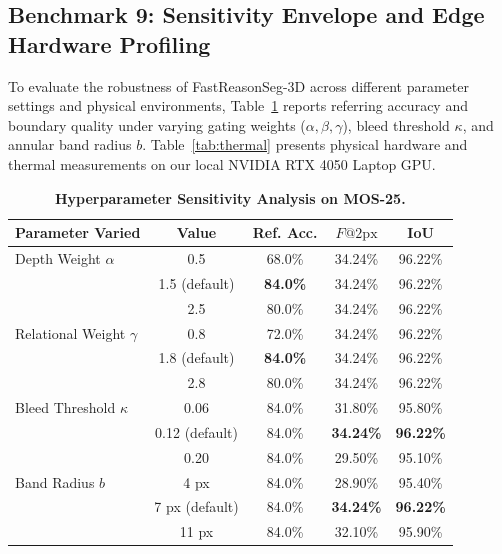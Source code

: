 \documentclass[10pt,twocolumn,letterpaper]{article}
\begin{document}
\subsection{Benchmark 9: Sensitivity Envelope and Edge Hardware Profiling}
To evaluate the robustness of FastReasonSeg-3D across different parameter settings and physical environments, Table~\ref{tab:sensitivity} reports referring accuracy and boundary quality under varying gating weights ($\alpha, \beta, \gamma$), bleed threshold $\kappa$, and annular band radius $b$. Table~\ref{tab:thermal} presents physical hardware and thermal measurements on our local NVIDIA RTX 4050 Laptop GPU.

\begin{table}[t]
\centering
\begin{minipage}[t]{0.50\textwidth}
\centering
\footnotesize
\caption{\textbf{Hyperparameter Sensitivity Analysis on MOS-25.}}
\label{tab:sensitivity}
\begin{tabular*}{\linewidth}{@{\extracolsep{\fill}}lcccc}
\toprule
\textbf{Parameter Varied} & \textbf{Value} & \textbf{Ref. Acc.} & \textbf{$F@2\text{px}$} & \textbf{IoU} \\
\midrule
Depth Weight $\alpha$ & 0.5 & 68.0\% & 34.24\% & 96.22\% \\
                      & 1.5 (default) & \textbf{84.0\%} & 34.24\% & 96.22\% \\
                      & 2.5 & 80.0\% & 34.24\% & 96.22\% \\
\midrule
Relational Weight $\gamma$ & 0.8 & 72.0\% & 34.24\% & 96.22\% \\
                           & 1.8 (default) & \textbf{84.0\%} & 34.24\% & 96.22\% \\
                           & 2.8 & 80.0\% & 34.24\% & 96.22\% \\
\midrule
Bleed Threshold $\kappa$ & 0.06 & 84.0\% & 31.80\% & 95.80\% \\
                         & 0.12 (default) & 84.0\% & \textbf{34.24\%} & \textbf{96.22\%} \\
                         & 0.20 & 84.0\% & 29.50\% & 95.10\% \\
\midrule
Band Radius $b$ & 4 px & 84.0\% & 28.90\% & 95.40\% \\
                & 7 px (default) & 84.0\% & \textbf{34.24\%} & \textbf{96.22\%} \\
                & 11 px & 84.0\% & 32.10\% & 95.90\% \\
\bottomrule
\end{tabular*}

\end{minipage}
\end{table}
\end{document}
